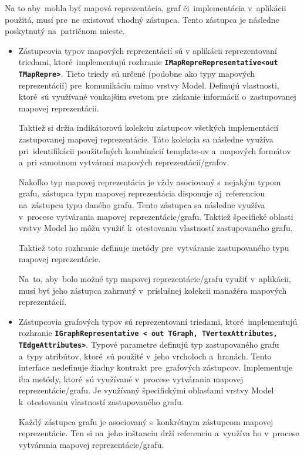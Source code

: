 Na to aby~mohla byť mapová reprezentácia, graf či~implementácia v~aplikácii použitá, musí pre~ne existovať vhodný zástupca. Tento zástupca je následne poskytnutý na~patričnom mieste.
\begin{itemize}
    \item Zástupcovia typov mapových reprezentácií sú v aplikácii reprezentovaní triedami, ktoré~implementujú rozhranie \textbf{\texttt{IMapRepreRepresentative<out TMapRepre>}}. Tieto triedy sú určené (podobne ako typy mapových reprezentácií) pre~komunikáciu mimo vrstvy Model. Definujú vlastnosti, ktoré~sú využívané vonkajším svetom pre~získanie informácií o~zastupovanej mapovej reprezentácii. 
    
    Taktiež si držia indikátorovú kolekciu zástupcov všetkých implementácií zastupovanej mapovej reprezentácie. Táto kolekcia sa následne využíva pri~identifikácii použiteľných kombinácií template-ov a~mapových formátov a~pri samotnom vytváraní mapových reprezentácií/grafov.
    
    Nakoľko typ mapovej reprezentácia je vždy asociovaný s~nejakým typom grafu, zástupca typu mapovej reprezentácia disponuje aj~referenciou na~zástupcu typu daného grafu. Tento zástupca sa následne využíva v~procese vytvárania mapovej reprezentácie/grafu. Taktiež špecifické oblasti vrstvy Model ho môžu využiť k~otestovaniu vlastností zastupovaného grafu.

    Taktiež toto rozhranie definuje metódy pre~vytváranie zastupovaného typu mapovej reprezentácie. 

    Na~to, aby~bolo možné typ mapovej reprezentácie/grafu využiť v~aplikácii, musí byť jeho zástupca zahrnutý v~príslušnej kolekcii manažéra mapových reprezentácií.

    \item Zástupcovia grafových typov sú reprezentovaní triedami, ktoré~implementujú rozhranie \textbf{\texttt{IGraphRepresentative < out TGraph, TVertexAttributes, TEdgeAttributes>}}. Typové parametre definujú typ zastupovaného grafu a~typy atribútov, ktoré~sú použité v~jeho vrcholoch a~hranách. Tento interface nedefinuje žiadny kontrakt pre~grafových zástupcov. Implementuje iba metódy, ktoré~sú využívané v~procese vytvárania mapovej reprezentácie/grafu. Je využívaný špecifickými oblasťami vrstvy Model k~otestovaniu vlastností zastupovaného grafu.

    Každý zástupca grafu je asociovaný s~konkrétnym zástupcom mapovej reprezentácie. Ten si na~jeho inštanciu drží referenciu a~využíva ho v~procese vytvárania mapovej reprezentácie/grafu.


\end{itemize}
